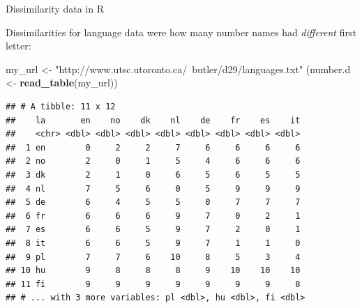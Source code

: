 \documentclass[
  ignorenonframetext,
]{beamer}
\newenvironment{Shaded}{\begin{snugshade}}{\end{snugshade}}
\newcommand{\KeywordTok}[1]{\textcolor[rgb]{0.13,0.29,0.53}{\textbf{#1}}}
\newcommand{\NormalTok}[1]{#1}
\newcommand{\StringTok}[1]{\textcolor[rgb]{0.31,0.60,0.02}{#1}}
\begin{document}
\begin{frame}[fragile]{Dissimilarity data in R}
\protect\hypertarget{dissimilarity-data-in-r}{}

Dissimilarities for language data were how many number names had
\emph{different} first letter:

\footnotesize

\begin{Shaded}
\begin{Highlighting}[]
\NormalTok{my_url <-}\StringTok{ "http://www.utsc.utoronto.ca/~butler/d29/languages.txt"}
\NormalTok{(number.d <-}\StringTok{ }\KeywordTok{read_table}\NormalTok{(my_url))}
\end{Highlighting}
\end{Shaded}

\begin{verbatim}
## # A tibble: 11 x 12
##    la       en    no    dk    nl    de    fr    es    it
##    <chr> <dbl> <dbl> <dbl> <dbl> <dbl> <dbl> <dbl> <dbl>
##  1 en        0     2     2     7     6     6     6     6
##  2 no        2     0     1     5     4     6     6     6
##  3 dk        2     1     0     6     5     6     5     5
##  4 nl        7     5     6     0     5     9     9     9
##  5 de        6     4     5     5     0     7     7     7
##  6 fr        6     6     6     9     7     0     2     1
##  7 es        6     6     5     9     7     2     0     1
##  8 it        6     6     5     9     7     1     1     0
##  9 pl        7     7     6    10     8     5     3     4
## 10 hu        9     8     8     8     9    10    10    10
## 11 fi        9     9     9     9     9     9     9     8
## # ... with 3 more variables: pl <dbl>, hu <dbl>, fi <dbl>
\end{verbatim}

\normalsize

\end{frame}
\end{document}
